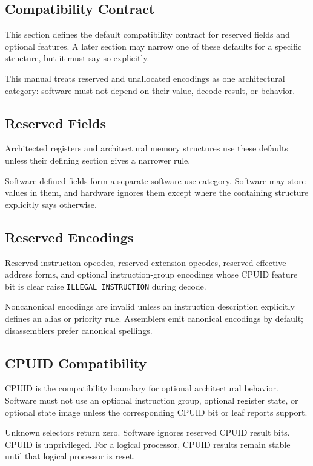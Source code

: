 \clearpage
\subsection{Compatibility Contract}

This section defines the default compatibility contract for reserved fields and optional features. A later section
may narrow one of these defaults for a specific structure, but it must say so explicitly.

This manual treats reserved and unallocated encodings as one architectural category: software must not depend on their
value, decode result, or behavior.

\subsection{Reserved Fields}
Architected registers and architectural memory structures use these defaults unless their defining section gives a
narrower rule.

Software-defined fields form a separate software-use category. Software may store values in them, and hardware
ignores them except where the containing structure explicitly says otherwise.



\subsection{Reserved Encodings}
Reserved instruction opcodes, reserved extension opcodes, reserved effective-address forms, and optional
instruction-group encodings whose CPUID feature bit is clear raise \texttt{ILLEGAL\_INSTRUCTION} during decode.

Noncanonical encodings are invalid unless an instruction description explicitly defines an alias or priority rule.
Assemblers emit canonical encodings by default; disassemblers prefer canonical spellings.

\Needspace{3.6in}
\subsection{CPUID Compatibility}
CPUID is the compatibility boundary for optional architectural behavior. Software must not use an optional
instruction group, optional register state, or optional state image unless the corresponding CPUID bit or leaf
reports support.

Unknown selectors return zero. Software ignores reserved CPUID result bits. CPUID is unprivileged. For a logical
processor, CPUID results remain stable until that logical processor is reset.
